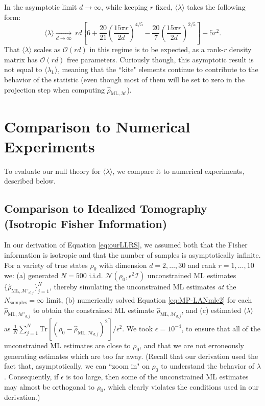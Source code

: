 \documentclass[aps,pra, twocolumn]{revtex4-1}
\newcommand{\M}{\mathcal{M}}
\newcommand{\rhohat}{\hat{\rho}}
\newcommand{\rhoML}[1]{\rhohat_{\scriptscriptstyle{\mathrm{ML},#1}}}
\begin{document}
In the asymptotic limit $d\rightarrow \infty$, while keeping $r$ fixed, $\langle \lambda \rangle$ takes the following form:
\begin{equation}
\langle \lambda \rangle \underset{d\rightarrow\infty}{\longrightarrow}~rd\left[6 +\frac{20}{21}\left(\frac{15\pi r}{2d}\right)^{4/5} - \frac{20}{7}\left(\frac{15\pi r}{2d}\right)^{2/5}\right]-5r^{2}.
\end{equation}
That $\langle \lambda \rangle$ scales as $\mathcal{O}(rd)$ in this regime is to be expected, as a rank-$r$ density matrix has $\mathcal{O}(rd)$ free parameters. Curiously though, this asymptotic result is not equal to $\langle \lambda_{\mathrm{L}}\rangle$, meaning that the ``kite" elements continue to contribute to the behavior of the statistic (even though most of them will be set to zero in the projection step when computing $\rhoML{\M}$).

\section{Comparison to Numerical Experiments}

To evaluate our null theory for $\langle \lambda \rangle$, we compare it to numerical experiments, described below.

\subsection{Comparison to Idealized Tomography (Isotropic Fisher Information)}
\label{sec:theorycomp1}

In our derivation of Equation \eqref{eq:ourLLRS}, we assumed both that the Fisher information is isotropic and that the number of samples is asymptotically infinite. For a variety of true states $\rho_{0}$ with dimension  $d=2,\ldots,30$ and rank $r=1,\ldots,10$ we: (a) generated $N=500$ i.i.d. $\mathcal{N}(\rho_{0}, \epsilon^{2}\mathcal{I})$ unconstrained ML estimates $\{\rhoML{\M'_{d, j}}\}_{j=1}^{N}$, thereby simulating the unconstrained ML estimates \emph{at} the $N_{\mathrm{samples}} = \infty$ limit, (b) numerically solved Equation \eqref{eq:MP-LANmle2} for each $\rhoML{\M'_{d, j}}$ to obtain the constrained ML estimate $\rhoML{\M_{d, j}}$, and (c) estimated $\langle \lambda \rangle$ as $\frac{1}{N}\sum_{j=1}^{N}\mathrm{Tr}[(\rho_{0} - \rhoML{\M_{d,j}})^{2}]/\epsilon^{2}$. We took $\epsilon = 10^{-4}$, to ensure that all of the unconstrained ML estimates are close to $\rho_{0}$, and that we are not erroneously generating estimates which are too far away. (Recall that our derivation used the fact that, asymptotically, we can ``zoom in" on $\rho_{0}$ to understand the behavior of $\lambda$. Consequently, if $\epsilon$ is too large, then some of the unconstrained ML estimates may almost be orthogonal to $\rho_{0}$, which clearly violates the conditions used in our derivation.)
\end{document}
